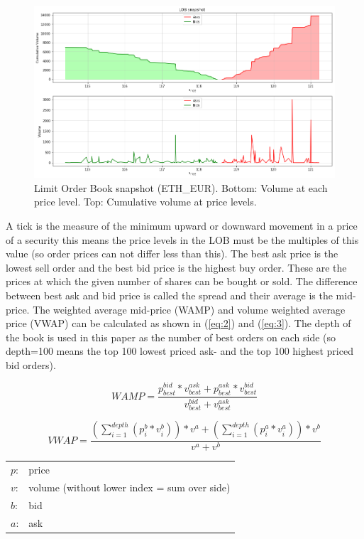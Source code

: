 \documentclass[11pt,a4paper,oneside]{article}
\begin{document}
  \begin{figure}[tbh]
    \centering
    \includegraphics[width=\textwidth]{lob_snapshot.png}
    \caption{Limit Order Book snapshot (ETH\_EUR). Bottom: Volume at each price level. Top: Cumulative volume at price levels.}
    \label{fig:1}
  \end{figure}

  A tick is the measure of the minimum upward or downward movement in a price of a security this means the price levels 
  in the LOB must be the multiples of this value (so order prices can not differ less than this). The best ask price is 
  the lowest sell order and the best bid price is the highest buy order. These are the prices at which the given number 
  of shares can be bought or sold. The difference between best ask and bid price is called the spread and their average 
  is the mid-price. The weighted average mid-price (WAMP) and volume weighted average price (VWAP) can be calculated as 
  shown in (\ref{eq:2}) and (\ref{eq:3}). The depth of the book is used in this paper as the number of best orders on 
  each side (so depth=100 means the top 100 lowest priced ask- and the top 100 highest priced bid orders).

  \begin{equation}
    WAMP = \frac{p_{best}^{bid} * v_{best}^{ask} + p_{best}^{ask} * v_{best}^{bid}}{v_{best}^{bid} + v_{best}^{ask}}
    \label{eq:2}
  \end{equation}

  \begin{equation}
    VWAP = \frac{(\sum_{i=1}^{depth} (p_i^b * v_i^b))*v^a + (\sum_{i=1}^{depth} (p_i^a * v_i^a))*v^b}{v^a + v^b}
    \label{eq:3}
  \end{equation}

  \begin{center}
    \begin{tabular}{l l}
      $p$: & price \\
      $v$: & volume (without lower index = sum over side) \\
      $b$: & bid \\
      $a$: & ask
    \end{tabular}
  \end{center}
\end{document}
